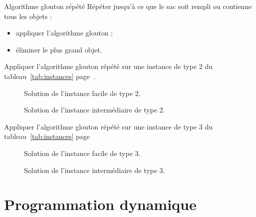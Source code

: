 \documentclass[11pt]{article}
\newcommand{\instance}[1]{instance de type #1 du tableau~\ref{tab:instances} page~\pageref{tab:instances}}
\begin{document}
  \begin{algorithme}{Algorithme glouton répété}
     \label{algo:mtgs}
    Répéter jusqu'à ce que le sac soit rempli ou contienne tous les objets :
    \begin{itemize}
    \item appliquer l'algorithme glouton ;
    \item éliminer le plus grand objet.
    \end{itemize}
  \end{algorithme}

  \begin{exercice}{}
    Appliquer l'algorithme glouton répété sur une \instance{2}.
  \end{exercice}

 \begin{figure}[htbp]
   \centering
   \resizebox{0.6\linewidth}{!}{
      
    }
    \caption{Solution de l'instance facile de type 2.}
  \end{figure}

  \begin{figure}[htbp]
    \centering
    \resizebox{0.6\linewidth}{!}{
      
    }
    \caption{Solution de l'instance intermédiaire de type 2.}
  \end{figure}


   \begin{exercice}{}
    \label{ex:ex4}
    Appliquer l'algorithme glouton répété sur une \instance{3}
  \end{exercice}

 \begin{figure}[htbp]
    \centering
    \resizebox{0.6\linewidth}{!}{
      
    }
    \caption{Solution de l'instance facile de type 3.}
  \end{figure}

  \begin{figure}[htbp]
    \centering
    \resizebox{0.6\linewidth}{!}{
      
    }
    \caption{Solution de l'instance intermédiaire de type 3.}
  \end{figure}


  \section{Programmation dynamique}
\end{document}
